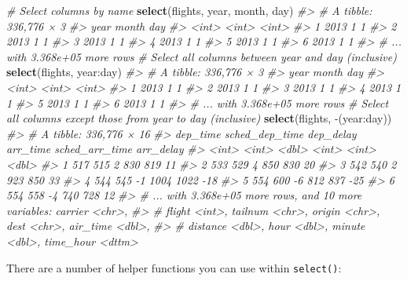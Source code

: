 \documentclass[]{book}
\newenvironment{Shaded}{\begin{snugshade}}{\end{snugshade}}
\newcommand{\KeywordTok}[1]{\textcolor[rgb]{0.13,0.29,0.53}{\textbf{{#1}}}}
\newcommand{\CommentTok}[1]{\textcolor[rgb]{0.56,0.35,0.01}{\textit{{#1}}}}
\newcommand{\NormalTok}[1]{{#1}}
\begin{document}
\begin{Shaded}
\begin{Highlighting}[]
\CommentTok{# Select columns by name}
\KeywordTok{select}\NormalTok{(flights, year, month, day)}
\CommentTok{#> # A tibble: 336,776 × 3}
\CommentTok{#>    year month   day}
\CommentTok{#>   <int> <int> <int>}
\CommentTok{#> 1  2013     1     1}
\CommentTok{#> 2  2013     1     1}
\CommentTok{#> 3  2013     1     1}
\CommentTok{#> 4  2013     1     1}
\CommentTok{#> 5  2013     1     1}
\CommentTok{#> 6  2013     1     1}
\CommentTok{#> # ... with 3.368e+05 more rows}
\CommentTok{# Select all columns between year and day (inclusive)}
\KeywordTok{select}\NormalTok{(flights, year:day)}
\CommentTok{#> # A tibble: 336,776 × 3}
\CommentTok{#>    year month   day}
\CommentTok{#>   <int> <int> <int>}
\CommentTok{#> 1  2013     1     1}
\CommentTok{#> 2  2013     1     1}
\CommentTok{#> 3  2013     1     1}
\CommentTok{#> 4  2013     1     1}
\CommentTok{#> 5  2013     1     1}
\CommentTok{#> 6  2013     1     1}
\CommentTok{#> # ... with 3.368e+05 more rows}
\CommentTok{# Select all columns except those from year to day (inclusive)}
\KeywordTok{select}\NormalTok{(flights, -(year:day))}
\CommentTok{#> # A tibble: 336,776 × 16}
\CommentTok{#>   dep_time sched_dep_time dep_delay arr_time sched_arr_time arr_delay}
\CommentTok{#>      <int>          <int>     <dbl>    <int>          <int>     <dbl>}
\CommentTok{#> 1      517            515         2      830            819        11}
\CommentTok{#> 2      533            529         4      850            830        20}
\CommentTok{#> 3      542            540         2      923            850        33}
\CommentTok{#> 4      544            545        -1     1004           1022       -18}
\CommentTok{#> 5      554            600        -6      812            837       -25}
\CommentTok{#> 6      554            558        -4      740            728        12}
\CommentTok{#> # ... with 3.368e+05 more rows, and 10 more variables: carrier <chr>,}
\CommentTok{#> #   flight <int>, tailnum <chr>, origin <chr>, dest <chr>, air_time <dbl>,}
\CommentTok{#> #   distance <dbl>, hour <dbl>, minute <dbl>, time_hour <dttm>}
\end{Highlighting}
\end{Shaded}

There are a number of helper functions you can use within
\texttt{select()}:
\end{document}
